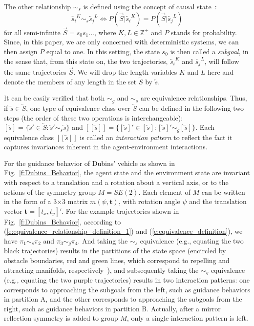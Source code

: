 \documentclass[journal]{IEEEtran}
\begin{document}
The other relationship $\sim_{s}$ is defined using the concept of causal state~\cite{shalizi2001computational}: 
\begin{equation}
\overleftarrow{s_i}^K \sim_{s} \overleftarrow{s_j}^L
\Leftrightarrow P(\overrightarrow{S}|\overleftarrow{s_i}^K) =
P(\overrightarrow{S}|\overleftarrow{s_j}^L)
\label{e:equivalence_definition}
\end{equation}
for all semi-infinite $\overrightarrow{S} = s_0 s_1...$, where $K,L
\in \mathbb{Z}^+$ and $P$ stands for probability. Since, in this paper, we are only concerned with deterministic systems, we can then assign $P$ equal to one. In this setting, the state $s_0$ is then called a \textit{subgoal}, in the sense that, from this state on, the two trajectories, $\overleftarrow{s_i}^K$ and $\overleftarrow{s_j}^L$, will follow the same trajectories $\overrightarrow{S}$. We will drop the length variables $K$ and $L$ here and denote the members of any length in the set $\overleftarrow{S}$ by $\overleftarrow{s}$. 

It can be easily verified that both $\sim_g$ and $\sim_s$ are equivalence relationships. Thus, if $\overleftarrow{s} \in \overleftarrow{S}$, one type of equivalence class over $\overleftarrow{S}$ can be defined in the following two steps (the order of these two operations is interchangeable): 
$[\overleftarrow{s}] = \{ \overleftarrow{s}' \in \overleftarrow{S}:
\overleftarrow{s}' \sim_s \overleftarrow{s}\}$
and 
$[[\overleftarrow{s}]] = \{ [\overleftarrow{s}]' \in [\overleftarrow{s}]:
[\overleftarrow{s}]' \sim_{g} [\overleftarrow{s}]\}
$. Each equivalence class $[[\overleftarrow{s}]]$ is called an \textit{interaction pattern} to reflect the fact it captures invariances inherent in the agent-environment interactions.

For the guidance behavior of Dubins' vehicle as shown in Fig.~\ref{f:Dubins_Behavior}, the agent state and the environment state are invariant with respect to a translation and a rotation about a vertical axis, or to the actions of the symmetry group $M = SE(2)$. Each element of $M$ can be written in the form of a 3$\times$3 matrix $m(\psi,\mathbf{t})$, with rotation angle $\psi$ and the translation vector $\mathbf{t} = [t_x,t_y]'$. For the example trajectories shown in Fig.~\ref{f:Dubins_Behavior}, according to (\ref{e:equivalence_relationship_definition_1}) and (\ref{e:equivalence_definition}), we have $\pi_1 \sim_s \pi_2$ and $\pi_3 \sim_g \pi_4$. And taking the $\sim_s$ equivalence (e.g., equating the two black trajectories) results in the partitions of the state space (encircled by obstacle boundaries, red and green lines, which correspond to repelling and attracting manifolds, respectively~\cite{kong2011investigation}), and subsequently taking the $\sim_g$ equivalence (e.g., equating the two purple trajectories) results in two interaction patterns: one corresponds to approaching the subgoals from the left, such as guidance behaviors in partition A, and the other corresponds to approaching the subgoals from the right, such as guidance behaviors in partition B. Actually, after a mirror reflection symmetry is added to group $M$, only a single interaction pattern is left.  
\end{document}
